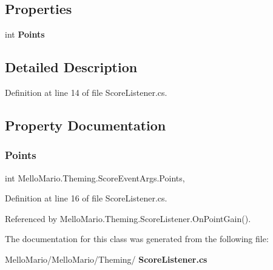 \subsection*{Properties}
\begin{DoxyCompactItemize}
\item 
int \textbf{ Points}\hspace{0.3cm}{\ttfamily  [get, set]}
\end{DoxyCompactItemize}


\subsection{Detailed Description}


Definition at line 14 of file Score\+Listener.\+cs.



\subsection{Property Documentation}
\mbox{\label{classMelloMario_1_1Theming_1_1ScoreEventArgs_a9b9abbba5ec8f1e41b0416acea0bb9e9}} 
\subsubsection{Points}
{\footnotesize\ttfamily int Mello\+Mario.\+Theming.\+Score\+Event\+Args.\+Points\hspace{0.3cm}{\ttfamily [get]}, {\ttfamily [set]}}



Definition at line 16 of file Score\+Listener.\+cs.



Referenced by Mello\+Mario.\+Theming.\+Score\+Listener.\+On\+Point\+Gain().



The documentation for this class was generated from the following file\+:\begin{DoxyCompactItemize}
\item 
Mello\+Mario/\+Mello\+Mario/\+Theming/\textbf{ Score\+Listener.\+cs}\end{DoxyCompactItemize}
